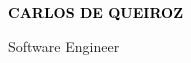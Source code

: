 \documentclass[9pt]{developercv} %
\begin{document}
\begin{center}
   
    {\fontsize{16}{20} \textcolor{black}{\textbf{\MakeUppercase{Carlos de Queiroz}}}} %
    \vspace{6pt}
    
    {\Large Software Engineer} %
    
\end{center}	



%         
%         




% 



\vspace{-10 pt}





\end{document}
